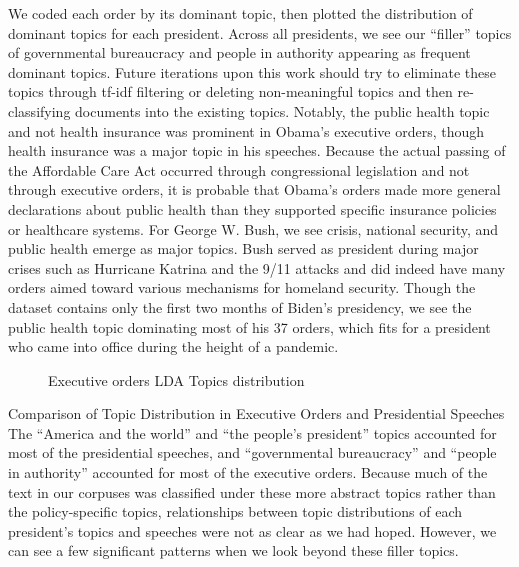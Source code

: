 \documentclass{article}
\begin{document}
{{We coded each order by its dominant topic, then plotted the distribution of dominant topics for each president. Across all presidents, we see our “filler” topics of governmental bureaucracy and people in authority appearing as frequent dominant topics. Future iterations upon this work should try to eliminate these topics through tf-idf filtering or deleting non-meaningful topics and then re-classifying documents into the existing topics. 
Notably, the public health topic and not health insurance was prominent in Obama’s executive orders, though health insurance was a major topic in his speeches. Because the actual passing of the Affordable Care Act occurred through congressional legislation and not through executive orders, it is probable that Obama’s orders made more general declarations about public health than they supported specific insurance policies or healthcare systems. For George W. Bush, we see crisis, national security, and public health emerge as major topics. Bush served as president during major crises such as Hurricane Katrina and the 9/11 attacks and did indeed have many orders aimed toward various mechanisms for homeland security. Though the dataset contains only the first two months of Biden’s presidency, we see the public health topic dominating most of his 37 orders, which fits for a president who came into office during the height of a pandemic.

\begin{figure}[H]
	\caption{\label{fig:my-label4} Executive orders LDA Topics distribution}
\end{figure}

\newpage

Comparison of Topic Distribution in Executive Orders and Presidential Speeches \\
The “America and the world” and “the people’s president” topics accounted for most of the presidential speeches, and “governmental bureaucracy” and “people in authority” accounted for most of the executive orders. Because much of the text in our corpuses was classified under these more abstract topics rather than the policy-specific topics, relationships between topic distributions of each president’s topics and speeches were not as clear as we had hoped. However, we can see a few significant patterns when we look beyond these filler topics.

}}
\end{document}
